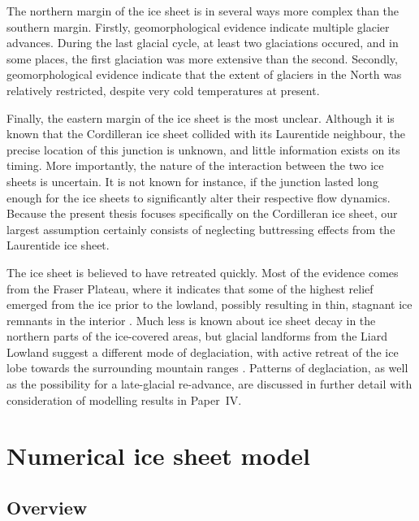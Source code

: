 \documentclass{article}
\newcommand{\CCYC}[0]{Paper~IV}     %
\begin{document}
The northern margin of the ice sheet is in several ways more complex than the
southern margin. Firstly, geomorphological evidence indicate multiple glacier
advances. During the last glacial cycle, at least two glaciations occured, and
in some places, the first glaciation was more extensive than the second.
Secondly, geomorphological evidence indicate that the extent of glaciers in the
North was relatively restricted, despite very cold temperatures at present.

Finally, the eastern margin of the ice sheet is the most unclear. Although it
is known that the Cordilleran ice sheet collided with its Laurentide neighbour,
the precise location of this junction is unknown, and little information exists
on its timing. More importantly, the nature of the interaction between the two
ice sheets is uncertain. It is not known for instance, if the junction lasted
long enough for the ice sheets to significantly alter their respective flow
dynamics. Because the present thesis focuses specifically on the Cordilleran
ice sheet, our largest assumption certainly consists of neglecting buttressing
effects from the Laurentide ice sheet.

The ice sheet is believed to have retreated quickly. Most of the evidence comes
from the Fraser Plateau, where it indicates that some of the highest relief
emerged from the ice prior to the lowland, possibly resulting in thin, stagnant
ice remnants in the interior
    \citep{Fulton.1967, Fulton.1991, Margold.etal.2011, Margold.etal.2013a}.
Much less is known about ice sheet decay in the northern parts of the
ice-covered areas, but glacial landforms from the Liard Lowland suggest a
different mode of deglaciation, with active retreat of the ice lobe towards the
surrounding mountain ranges \citep{Margold.etal.2013}. Patterns of
deglaciation, as well as the possibility for a late-glacial re-advance, are
discussed in further detail with consideration of modelling results in \CCYC.

\section{Numerical ice sheet model}

\subsection{Overview}
\end{document}
